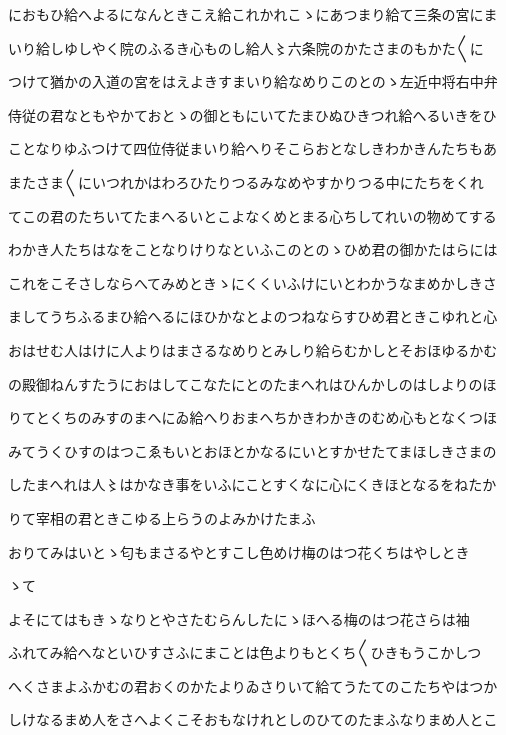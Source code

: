 \documentclass[a4paper,11pt,landscape]{ltjtarticle}
\begin{document}
におもひ給へよるになんときこえ給これかれこゝにあつまり給て三条の宮にま
\par\medskip
いり給しゆしやく院のふるき心ものし給人〻六条院のかたさまのもかた〱に
\par\medskip
つけて猶かの入道の宮をはえよきすまいり給なめりこのとのゝ左近中将右中弁
\par\medskip
侍従の君なともやかておとゝの御ともにいてたまひぬひきつれ給へるいきをひ
\par\medskip
ことなりゆふつけて四位侍従まいり給へりそこらおとなしきわかきんたちもあ
\par\medskip
またさま〱にいつれかはわろひたりつるみなめやすかりつる中にたちをくれ
\par\medskip
てこの君のたちいてたまへるいとこよなくめとまる心ちしてれいの物めてする
\par\medskip
わかき人たちはなをことなりけりなといふこのとのゝひめ君の御かたはらには
\par\medskip
これをこそさしならへてみめときゝにくくいふけにいとわかうなまめかしきさ
\par\medskip
ましてうちふるまひ給へるにほひかなとよのつねならすひめ君ときこゆれと心
\par\medskip
おはせむ人はけに人よりはまさるなめりとみしり給らむかしとそおほゆるかむ
\par\medskip
の殿御ねんすたうにおはしてこなたにとのたまへれはひんかしのはしよりのほ
\par\medskip
りてとくちのみすのまへにゐ給へりおまへちかきわかきのむめ心もとなくつほ
\par\medskip
みてうくひすのはつこゑもいとおほとかなるにいとすかせたてまほしきさまの
\par\medskip
したまへれは人〻はかなき事をいふにことすくなに心にくきほとなるをねたか
\par\medskip
りて宰相の君ときこゆる上らうのよみかけたまふ
\par\medskip
おりてみはいとゝ匂もまさるやとすこし色めけ梅のはつ花くちはやしとき
\par\medskip
ゝて
\par\medskip
よそにてはもきゝなりとやさたむらんしたにゝほへる梅のはつ花さらは袖
\par\medskip
ふれてみ給へなといひすさふにまことは色よりもとくち〱ひきもうこかしつ
\par\medskip
へくさまよふかむの君おくのかたよりゐさりいて給てうたてのこたちやはつか
\par\medskip
しけなるまめ人をさへよくこそおもなけれとしのひてのたまふなりまめ人とこ
\par\medskip
\end{document}
